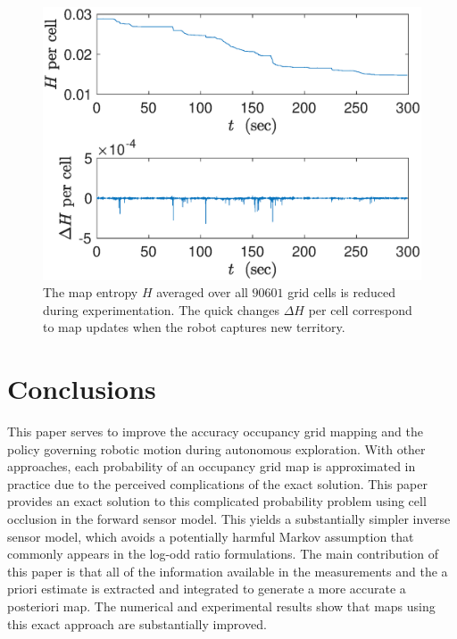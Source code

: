 \documentclass[smallextended]{svjour3}       %
\begin{document}
\begin{figure}
	\centering
	\includegraphics[width=\textwidth]{JIRS_fig11.eps}
	\caption{The map entropy $H$ averaged over all $90601$ grid cells is reduced during experimentation. The quick changes $\Delta H$ per cell correspond to map updates when the robot captures new territory.}
\label{fig:ExperimentH}
\end{figure}
















\section{Conclusions}
\label{sec:Conclusion}

This paper serves to improve the accuracy occupancy grid mapping and the policy governing robotic motion during autonomous exploration.
With other approaches, each probability of an occupancy grid map is approximated in practice due to the perceived complications of the exact solution.
This paper provides an exact solution to this complicated probability problem using cell occlusion in the forward sensor model. This yields a substantially simpler inverse sensor model, which avoids a potentially harmful Markov assumption that commonly appears in the log-odd ratio formulations. The main contribution of this paper is that all of the information available in the measurements and the a priori estimate is extracted and integrated to generate a more accurate a posteriori map. The numerical and experimental results show that maps using this exact approach are substantially improved. 
\end{document}
